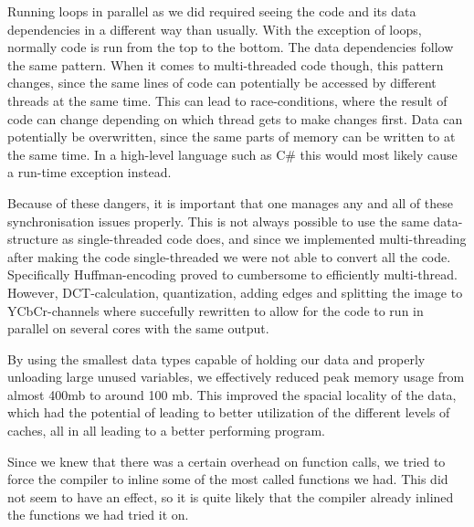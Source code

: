 Running loops in parallel as we did required seeing the code and its data dependencies in a different way than usually.
With the exception of loops, normally code is run from the top to the bottom.
The data dependencies follow the same pattern.
When it comes to multi-threaded code though, this pattern changes, since the same lines of code can potentially be accessed by different threads at the same time.
This can lead to race-conditions, where the result of code can change depending on which thread gets to make changes first.
Data can potentially be overwritten, since the same parts of memory can be written to at the same time.
In a high-level language such as C\# this would most likely cause a run-time exception instead.

Because of these dangers, it is important that one manages any and all of these synchronisation issues properly.
This is not always possible to use the same data-structure as single-threaded code does, and since we implemented multi-threading after making the code single-threaded we were not able to convert all the code.
Specifically Huffman-encoding proved to cumbersome to efficiently multi-thread.
However, DCT-calculation, quantization, adding edges and splitting the image to YCbCr-channels where succefully rewritten to allow for the code to run in parallel on several cores with the same output.

By using the smallest data types capable of holding our data and properly unloading large unused variables, we effectively reduced peak memory usage from almost 400mb to around 100 mb.
This improved the spacial locality of the data, which had the potential of leading to better utilization of the different levels of caches, all in all leading to a better performing program.

Since we knew that there was a certain overhead on function calls, we tried to force the compiler to inline some of the most called functions we had. 
This did not seem to have an effect, so it is quite likely that the compiler already inlined the functions we had tried it on.

